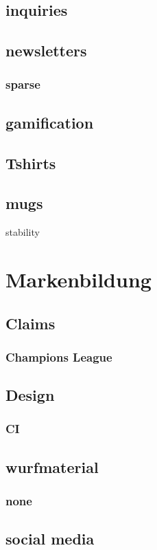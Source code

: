 \documentclass[output=guidelines,guidelines] {langscibook}
\begin{document}
\subsection{inquiries}
\subsection{newsletters}
\subsubsection{sparse}
\subsection{gamification}
\subsection{Tshirts}
\subsection{mugs}

stability 
\section{Markenbildung}
\subsection{Claims}
\subsubsection{Champions League}
\subsection{Design}
\subsubsection{CI}
\subsection{wurfmaterial}
\subsubsection{none}
\subsection{social media}
\end{document}
